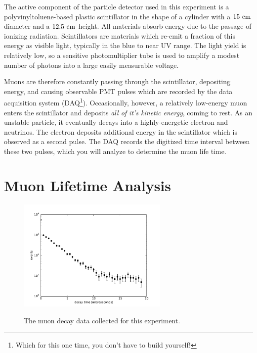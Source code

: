 The active component of the particle detector used in this experiment is a polyvinyltoluene-based plastic scintillator in the shape of a cylinder with a $15~\rm cm$ diameter and a $12.5~\rm cm$ height.  All materials absorb energy due to the passage of ionizing radiation.  Scintillators are materials which re-emit a fraction of this energy as visible light, typically in the blue to near UV range.   The light yield is relatively low, so a sensitive photomultiplier tube is used to amplify a modest number of photons into a large easily measurable voltage. 

Muons are therefore constantly passing through the scintillator, depositing energy, and causing observable PMT pulses which are recorded by the data acquisition system (DAQ\footnote{Which for this one time, you don't have to build yourself!}).  Occasionally, however, a relatively low-energy muon enters the scintillator and deposits {\em all of it's kinetic energy}, coming to rest.  As an unstable particle, it eventually decays into a highly-energetic electron and neutrinos.  The electron deposits additional energy in the scintillator which is observed as a second pulse.  The DAQ records the digitized time interval between these two pulses, which you will analyze to determine the muon life time.

\section{Muon Lifetime Analysis}

\begin{figure}[htbp]
\begin{center}
{\includegraphics[width=0.65\textwidth]{figs/muon/muon.pdf}}\\
\end{center}
\caption{\label{fig:muon}  The muon decay data collected for this experiment.}\end{figure}

